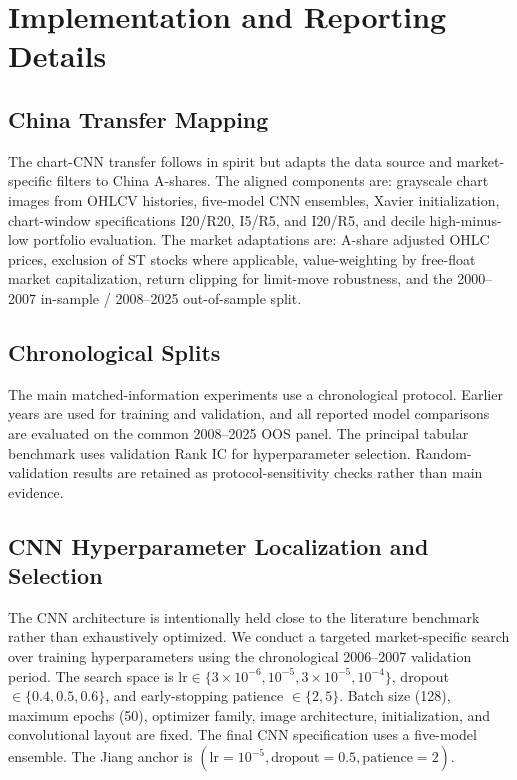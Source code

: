 \section{Implementation and Reporting Details}
\label{sec:implementation}

\subsection{China Transfer Mapping}

The chart-CNN transfer follows \citet{jiang2023reimagining} in spirit but adapts the data source and market-specific filters to China A-shares. The aligned components are: grayscale chart images from OHLCV histories, five-model CNN ensembles, Xavier initialization, chart-window specifications I20/R20, I5/R5, and I20/R5, and decile high-minus-low portfolio evaluation. The market adaptations are: A-share adjusted OHLC prices, exclusion of ST stocks where applicable, value-weighting by free-float market capitalization, return clipping for limit-move robustness, and the 2000--2007 in-sample / 2008--2025 out-of-sample split.

\subsection{Chronological Splits}

The main matched-information experiments use a chronological protocol. Earlier years are used for training and validation, and all reported model comparisons are evaluated on the common 2008--2025 OOS panel. The principal tabular benchmark uses validation Rank IC for hyperparameter selection. Random-validation results are retained as protocol-sensitivity checks rather than main evidence.

\subsection{CNN Hyperparameter Localization and Selection}

The CNN architecture is intentionally held close to the literature benchmark rather than exhaustively optimized. We conduct a targeted market-specific search over training hyperparameters using the chronological 2006--2007 validation period. The search space is $\mathrm{lr}\in\{3\times10^{-6},10^{-5},3\times10^{-5},10^{-4}\}$, dropout $\in\{0.4,0.5,0.6\}$, and early-stopping patience $\in\{2,5\}$. Batch size (128), maximum epochs (50), optimizer family, image architecture, initialization, and convolutional layout are fixed. The final CNN specification uses a five-model ensemble. The Jiang anchor is $(\mathrm{lr}=10^{-5},\mathrm{dropout}=0.5,\mathrm{patience}=2)$.

